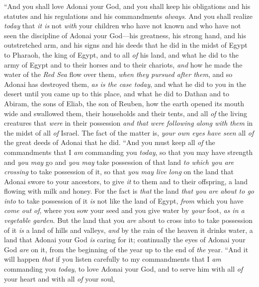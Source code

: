 \begin{biblechapter} %
\verse “And you shall love Adonai your God, and you shall keep his obligations and his statutes and his regulations and his commandments \textit{always}.
\verse And you shall realize \textit{today} that \textit{it is} not \textit{with} your children who have not known and who have not seen the discipline of Adonai your God—his greatness, his strong hand, and his outstretched arm,
\verse and his signs and his deeds that he did in the midst of Egypt to Pharaoh, the king of Egypt, and to all \textit{of} his land,
\verse and what he did to the army of Egypt and to their horses and to their chariots, \textit{and} how he made the water of the \textit{Red Sea} flow over them, \textit{when they pursued after them}, and so Adonai has destroyed them, \textit{as is the case today},
\verse and what he did to you in the desert until you came up to this place,
\verse and what he did to Dathan and to Abiram, the sons of Eliab, the son of Reuben, how the earth opened its mouth wide and swallowed them, their households and their tents, and all \textit{of} the living creatures that \textit{were} in their possession \textit{and that were} \textit{following along with them} in the midst of all \textit{of} Israel.
\verse The fact of the matter is, \textit{your own eyes have seen} all \textit{of} the great deeds of Adonai that he did.
\verse “And you must keep all \textit{of} the commandments that I \textit{am} commanding you \textit{today}, so that you may have strength and \textit{you may} go and \textit{you may} take possession of that land \textit{to which you are crossing} to take possession of it,
\verse so that \textit{you may live long} on the land that Adonai swore to your ancestors, to give \textit{it} to them and to their offspring, a land flowing with milk and honey.
\verse For the fact is \textit{that} the land \textit{that you are about to go into} to take possession of it \textit{is} not like the land of Egypt, \textit{from} which you have \textit{come out of}, where you sow your seed and you give water by \textit{your} foot, \textit{as in a vegetable garden}.
\verse But the land that you \textit{are} about to cross into to take possession of it \textit{is} a land of hills and valleys, \textit{and} by the rain of the heaven it drinks water,
\verse a land that Adonai your God \textit{is} caring for it; continually the eyes of Adonai your God \textit{are} on it, from the beginning of the year up to the end of \textit{the} year.
\verse “And it will happen \textit{that} if you listen carefully to my commandments that I \textit{am} commanding you \textit{today}, to love Adonai your God, and to serve him with all \textit{of} your heart and with all \textit{of} your soul,

\end{biblechapter}
